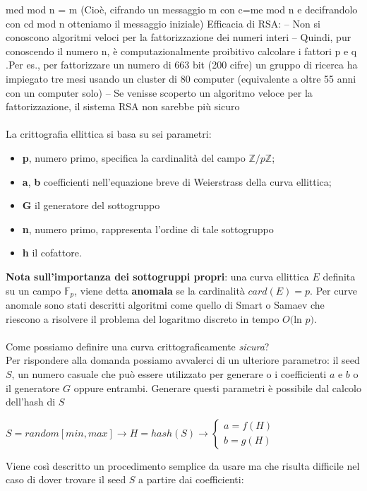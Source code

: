\documentclass[a4paper,12pt]{tesiinfo}
\begin{document}
med mod n = m (Cio\`e, cifrando un messaggio m con c=me mod n e decifrandolo con cd mod n otteniamo il messaggio iniziale)
Efficacia di RSA:
– Non si conoscono algoritmi veloci per la fattorizzazione dei numeri interi
– Quindi, pur conoscendo il numero n, \`e computazionalmente proibitivo calcolare i fattori p e q .Per es., per fattorizzare un numero di 663 bit (200 cifre) un
gruppo di ricerca ha impiegato tre mesi usando un cluster di 80 computer (equivalente a oltre 55 anni con un computer solo) – Se venisse scoperto un algoritmo veloce per la fattorizzazione, il sistema RSA non sarebbe pi\`u sicuro
\\
\\
La crittografia ellittica si basa su sei parametri:
\begin{itemize}
  \item \textbf{p}, numero primo, specifica la cardinalit\`a del campo $\mathbb{Z}/p\mathbb{Z}$;
  \item \textbf{a}, \textbf{b} coefficienti nell'equazione breve di Weierstrass della curva ellittica;
  \item \textbf{G} il generatore del sottogruppo
  \item \textbf{n}, numero primo, rappresenta l'ordine di tale sottogruppo
  \item \textbf{h} il cofattore.
\end{itemize}
\textbf{Nota sull'importanza dei sottogruppi propri}: una curva ellittica $E$ definita su un campo $\mathbb{F}_p$, viene detta \textbf{anomala} se la cardinalit\`a $card(E) = p$. Per curve anomale sono stati descritti algoritmi come quello di Smart o Samaev che riescono a risolvere il problema del logaritmo discreto in tempo $O($ln $p)$.
\\
\\
Come possiamo definire una curva crittograficamente \textit{sicura}?
\\
Per rispondere alla domanda possiamo avvalerci di un ulteriore parametro: il seed $S$, un numero casuale che pu\`o essere utilizzato per generare o i coefficienti $a$ e $b$ o il generatore $G$ oppure entrambi. Generare questi parametri \`e possibile dal calcolo dell'hash di $S$
\begin{center}
  $S = random[min, max] \to H = hash(S) \to 
  \begin{cases}
    a = f(H)\\
    b = g(H)
  \end{cases}$
\end{center}
Viene cos\`i descritto un procedimento semplice da usare ma che risulta difficile nel caso di dover trovare il seed $S$ a partire dai coefficienti:
\end{document}
